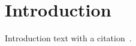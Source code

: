 \section{Introduction}\label{sec:introduction}
Introduction text with a citation~\cite{example2024}.
